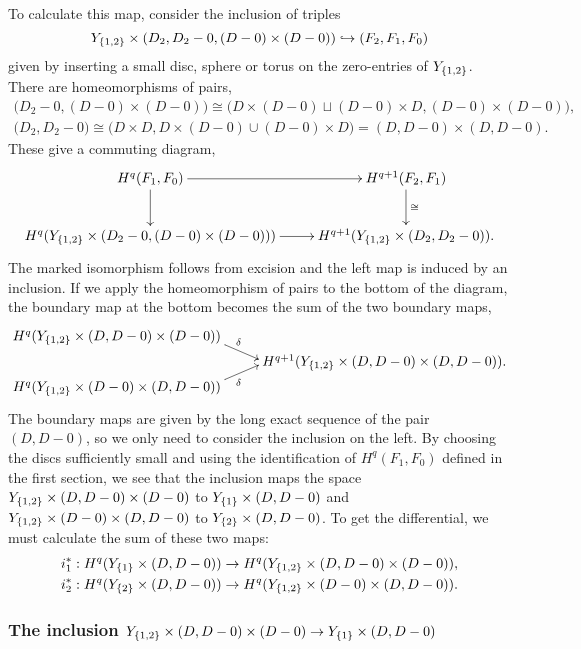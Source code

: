 To calculate this map, consider the inclusion of triples
\[ Y_{\left\{ 1,2 \right\}}\times (D_2,D_2-0,(D-0)\times (D-0)) \hookrightarrow
(F_2,F_1,F_0) \]
given by inserting a small disc, sphere or torus on the zero-entries
of $Y_{\left\{ 1,2 \right\}}$. There are homeomorphisms of pairs,
\begin{align*}
  \big(D_2-0,(D-0)\times(D-0)\big) \cong \big(D\times (D-0) \sqcup
  (D-0)\times D, (D-0)\times(D-0)\big), \\
  \big(D_2,D_2-0\big) \cong \big(D\times D,D\times
  (D-0)\cup (D-0)\times D\big) =  (D,D-0)\times (D,D-0).
\end{align*}
These give a commuting diagram,
\[ \xymatrix{ H^q(F_1,F_0) \ar[r] \ar[d] & H^{q+1}(F_2,F_1)
  \ar[d]^\cong \\ 
  H^q(Y_{\set{1,2}}\times (D_2-0,(D-0)\times (D-0))) \ar[r]
&
  H^{q+1}(Y_{\set{1,2}} \times (D_2,D_2-0)). %
} \]
The marked isomorphism follows from excision and the left map is
induced by an inclusion. If we apply the
homeomorphism of pairs to the bottom of the diagram, the boundary map
at the bottom becomes the sum of the two boundary maps,
\[ \xymatrix@R=0.1em{ H^q(Y_{\set{1,2}}\times (D,D-0)\times (D-0))
  \ar[]!<15ex,0ex>;[rd]!<-20ex,0ex>^{\delta} \\
  & H^{q+1}(Y_{\set{1,2}}\times (D,D-0)\times (D,D-0)). \\
  H^q(Y_{\set{1,2}}\times (D-0)\times (D,D-0))
  \ar[]!<15ex,0ex>;[ur]!<-20ex,0ex>_\delta } \]
The boundary maps are given by the long exact sequence of the pair
$(D,D-0)$, so we only need to consider the inclusion on the left. By
choosing the discs sufficiently small and using the identification of
$H^q(F_1,F_0)$ defined in the first section, 
we see that the inclusion maps the space $Y_{\left\{ 1,2 \right\}}\times
(D,D-0)\times (D-0)$ to $Y_{\left\{ 1 \right\}}\times(D,D-0)$ and
$Y_{\left\{ 1,2 \right\}}\times (D-0)\times (D,D-0)$ to $Y_{\left\{ 2 \right\}}\times
(D,D-0)$. To get the differential, we must calculate the sum of these
two maps:
\begin{align*}
  i_1^* : H^q(Y_{\left\{ 1 \right\}}\times (D,D-0)) &\to H^q(Y_{\left\{ 1,2 \right\}}\times
  (D,D-0)\times (D-0)), \\
  i_2^* : H^q(Y_{\left\{ 2 \right\}}\times (D,D-0)) &\to H^q(Y_{\left\{ 1,2 \right\}}\times
  (D-0) \times (D,D-0)).
\end{align*}

\subsubsection{The inclusion $Y_{\left\{ 1,2 \right\}}\times (D,D-0) 
\times (D-0) \to Y_{\left\{ 1 \right\}} \times (D,D-0)$}   


